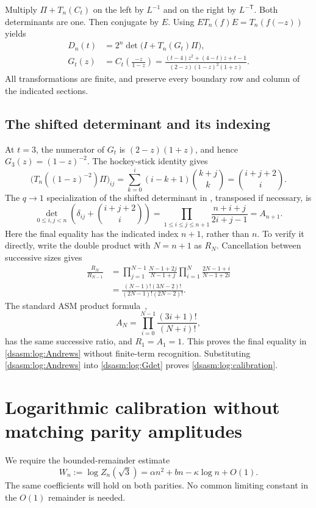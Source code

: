 \documentclass[11pt,letterpaper]{article}
\theoremstyle{remark}\newtheorem{remark}[theorem]{Remark}
\begin{document}
Multiply $\Pi+T_n(C_t)$ on the left by $L^{-1}$ and on the right by
$L^{-\mathsf T}$. Both determinants are one. Then conjugate by $E$.
Using $E T_n(f)E=T_n(f(-z))$ yields
\begin{equation}\label{dsasm:log:Gdet}
\begin{split}
 D_n(t)&=2^n\det\bigl(I+T_n(G_t)\Pi\bigr),\\
 G_t(z)&=C_t\!\left(\frac{-z}{1-z}\right)
 =\frac{(t-4)z^2+(4-t)z+t-1}{(2-z)(1-z)^2(1+z)}.
\end{split}
\end{equation}
All transformations are finite, and preserve every boundary row and
column of the indicated sections.

\subsection{The shifted determinant and its indexing}
At $t=3$, the numerator of $G_t$ is $(2-z)(1+z)$, and hence
$G_3(z)=(1-z)^{-2}$. The hockey-stick identity gives
\[
 \bigl(T_n((1-z)^{-2})\Pi\bigr)_{ij}
 =\sum_{k=0}^i(i-k+1)\binom{k+j}{k}
 =\binom{i+j+2}{i}.
\]
The $q\to1$ specialization of the shifted determinant in
\cite[Theorem 34, Equation (3.24)]{kratt}, transposed if necessary, is
\begin{equation}\label{dsasm:log:Andrews}
 \det_{0\le i,j<n}\left(\delta_{ij}+\binom{i+j+2}{i}\right)
 =\prod_{1\le i\le j\le n+1}\frac{n+i+j}{2i+j-1}
 =A_{n+1}.
\end{equation}
Here the final equality has the indicated index $n+1$, rather than $n$.
To verify it directly, write the double product with $N=n+1$ as $R_N$.
Cancellation between successive sizes gives
\begin{align*}
 \frac{R_N}{R_{N-1}}
 &=\prod_{j=1}^{N-1}\frac{N-1+2j}{N-1+j}
   \prod_{i=1}^{N}\frac{2N-1+i}{N-1+2i}\\
 &=\frac{(N-1)!(3N-2)!}{(2N-1)!(2N-2)!}.
\end{align*}
The standard ASM product formula~\cite[Equation (1.1)]{bfk},
\begin{equation}\label{dsasm:log:ASMproduct}
 A_N=\prod_{i=0}^{N-1}\frac{(3i+1)!}{(N+i)!},
\end{equation}
has the same successive ratio, and $R_1=A_1=1$. This proves the final
equality in \eqref{dsasm:log:Andrews} without finite-term recognition. Substituting
\eqref{dsasm:log:Andrews} into \eqref{dsasm:log:Gdet} proves \eqref{dsasm:log:calibration}.

\section{Logarithmic calibration without matching parity amplitudes}
\label{dsasm:log:sec:logcalibration}
We require the bounded-remainder estimate
\begin{equation}\label{dsasm:log:W}
 W_n:=\log Z_n(\sqrt3)
 =\alpha n^2+bn-\kappa\log n+O(1).
\end{equation}
The same coefficients will hold on both parities. No common limiting
constant in the $O(1)$ remainder is needed.
\end{document}
